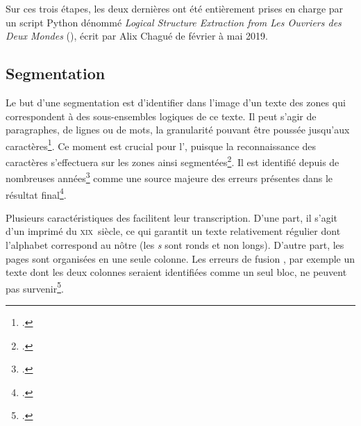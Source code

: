 Sur ces trois étapes, les deux dernières ont été entièrement prises en charge par un script Python dénommé \textit{Logical Structure Extraction from Les Ouvriers des Deux Mondes} (\lse), écrit par Alix Chagué de février à mai 2019.

\subsection{Segmentation}

Le but d'une segmentation est d'identifier dans l'image d'un texte des zones qui correspondent à des sous-ensembles logiques de ce texte. Il peut s'agir de paragraphes, de lignes ou de mots, la granularité pouvant être poussée jusqu'aux caractères\footcite[p. 3]{karpinski}. Ce moment est crucial pour l'\ocr, puisque la reconnaissance des caractères s'effectuera sur les zones ainsi segmentées\footcite[p. 3]{casey}. Il est identifié depuis de nombreuses années\footcite[p. 4]{casey} comme une source majeure des erreurs présentes dans le résultat final\footcite[p. 120]{elagouni}.

Plusieurs caractéristiques des \odm{} facilitent leur transcription. D'une part, il s'agit d'un imprimé du \textsc{xix}\ieme ~siècle, ce qui garantit un texte relativement régulier dont l'alphabet correspond au nôtre (les \textit{s} sont ronds et non longs). D'autre part, les pages sont organisées en une seule colonne. Les erreurs \og de fusion \fg{}, par exemple un texte dont les deux colonnes seraient identifiées comme un seul bloc, ne peuvent pas survenir\footcite[p. 5]{karpinski}.

